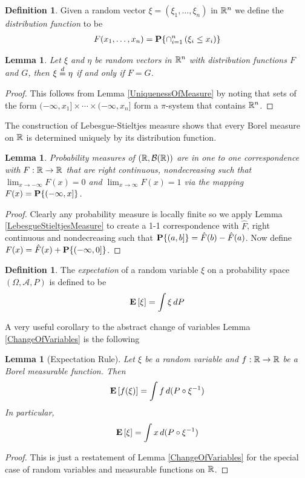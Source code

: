 \documentclass{amsart}
\newtheorem{lem}[thm]{Lemma}
\theoremstyle{remark}
\theoremstyle{definition}
\newtheorem{defn}[thm]{Definition}
\begin{document}
\begin{defn}Given a random vector $\xi = (\xi_1, \dots, \xi_n)$ in
  $\mathbb{R}^n$ we define the \emph{distribution function} to be 
\begin{align*}
F(x_1, \dots, x_n) = \textbf{P}\{\cap_{i=1}^n \left ( \xi_i \leq x_i
    \right ) \}
\end{align*}
\end{defn}
\begin{lem}\label{DistributionFunctionCharacterizeProbability}Let $\xi$ and $\eta$ be random vectors in $\mathbb{R}^n$ with
  distribution functions $F$ and $G$, then
  $\xi \overset{d}= \eta$ if and only if $F = G$.
\end{lem}
\begin{proof}This follows from Lemma \ref{UniquenessOfMeasure} by
  noting
  that sets of the form $(-\infty, x_1] \times \cdots \times (-\infty,
  x_n]$ form a $\pi$-system that contains $\mathbb{R}^n$.
\end{proof}

The construction of Lebesgue-Stieltjes measure shows that every
Borel measure on $\mathbb{R}$ is determined uniquely by its distribution function.
\begin{lem}Probability measures of $(\mathbb{R}, \mathcal{B}(\mathbb{R}))$ are
  in one to one correspondence with $F : \mathbb{R} \to \mathbb{R}$ that are
  right continuous, nondecreasing such that $\lim_{x \to -\infty} F(x)
  = 0$ and $\lim_{x \to \infty} F(x) = 1$ via the mapping $F(x) =
  \textbf{P}\{(-\infty, x]\}$.
\end{lem}
\begin{proof}Clearly any probability measure is locally finite so we
  apply Lemma \ref{LebesgueStieltjesMeasure} to create a 1-1
  correspondence with $\hat{F}$, 
  right continuous and nondecreasing such that $\textbf{P}\{(a,b]\} =
  \hat{F}(b) - \hat{F}(a)$.  Now define $F(x) = \hat{F}(x) +
  \textbf{P}\{(-\infty, 0]\}$.
\end{proof}

\begin{defn}The \emph{expectation} of a random variable $\xi$ on a
  probability space $(\Omega, \mathcal{A}, P)$ is
  defined to be 
\begin{align*}
\textbf{E}\left[\xi\right] = \int \xi \, dP
\end{align*}
\end{defn}
A very useful corollary to the abstract change of variables Lemma
\ref{ChangeOfVariables} is the following
\begin{lem}[Expectation Rule]\label{ExpectationRule}Let $\xi$ be a random variable and $f: \mathbb{R} \to \mathbb{R}$
  be a Borel measurable function.  Then 
\begin{align*}
\textbf{E}\left[f(\xi)\right] = \int f \, d (P \circ \xi^{-1})
\end{align*}
In particular, 
\begin{align*}
\textbf{E}\left[\xi\right] = \int x \, d (P \circ \xi^{-1})
\end{align*}
\end{lem}
\begin{proof}This is just a restatement of Lemma
  \ref{ChangeOfVariables} for the special case of random variables and
  measurable functions on $\mathbb{R}$.
\end{proof}
\end{document}
